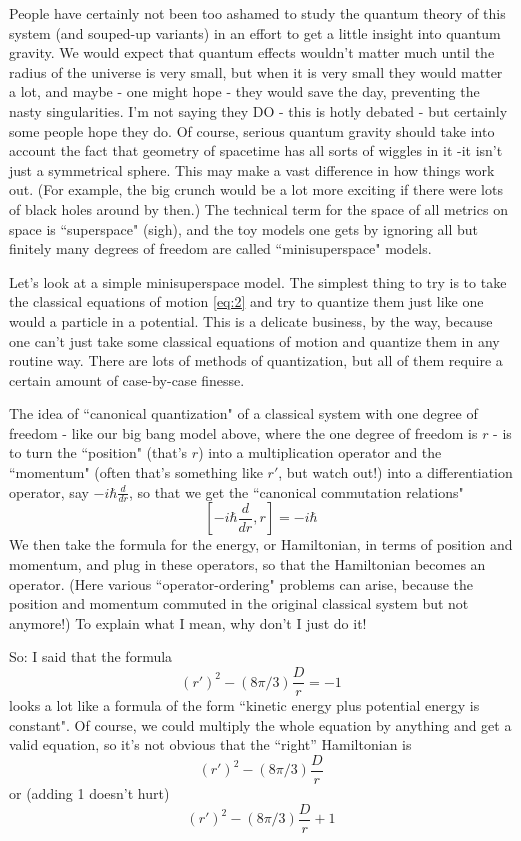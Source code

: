 People have certainly not been too ashamed to study the quantum theory of this system (and souped-up variants) in an effort to get a little insight into quantum gravity. We would expect that quantum effects wouldn't matter much until the radius of the universe is very small, but when it is very small they would matter a lot, and maybe - one might hope - they would save the day, preventing the nasty singularities. I'm not saying they DO - this is hotly debated - but certainly some people hope they do. Of course, serious quantum gravity should take into account the fact that geometry of spacetime has all sorts of wiggles in it -it isn't just a symmetrical sphere. This may make a vast difference in how things work out. (For example, the big crunch would be a lot more exciting if there were lots of black holes around by then.) The technical term for the space of all metrics on space is ``superspace" (sigh), and the toy models one gets by ignoring all but finitely many degrees of freedom are called ``minisuperspace" models.

Let's look at a simple minisuperspace model. The simplest thing to try is to take the classical equations of motion \eqref{eq:2} and try to quantize them just like one would a particle in a potential. This is a delicate business, by the way, because one can't just take some classical equations of motion and quantize them in any routine way. There are lots of methods of quantization, but all of them require a certain amount of case-by-case finesse.

The idea of ``canonical quantization" of a classical system with one degree of freedom - like our big bang model above, where the one degree of freedom is $r$ - is to turn the ``position" (that's $r$) into a multiplication operator and the ``momentum" (often that's something like $r'$, but watch out!) into a differentiation operator, say $-i\hbar \frac{d}{dr}$, so that we get the ``canonical commutation relations"
\[[-i\hbar \frac{d}{dr},r] = -i\hbar\]
We then take the formula for the energy, or Hamiltonian, in terms of position and momentum, and plug in these operators, so that the Hamiltonian becomes an operator. (Here various ``operator-ordering" problems can arise, because the position and momentum commuted in the original classical system but not anymore!) To explain what I mean, why don't I just do it!

So: I said that the formula
\begin{equation}
    (r')^2 - (8\pi/3) \frac{D}{r} = -1
\end{equation}
looks a lot like a formula of the form ``kinetic energy plus potential energy is constant". Of course, we could multiply the whole equation by anything and get a valid equation, so it's not obvious that the ``right'' Hamiltonian is
\[(r')^2 - (8\pi/3) \frac{D}{r}\]
or (adding 1 doesn't hurt)
\[(r')^2 - (8\pi/3) \frac{D}{r} + 1\]

